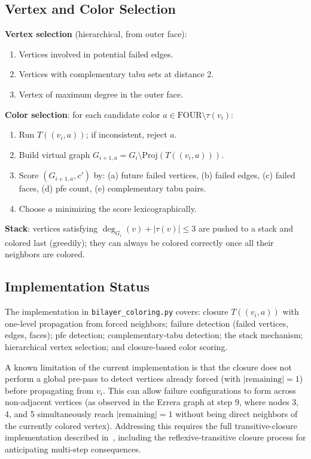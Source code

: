 \documentclass[12pt,letterpaper]{article}
\theoremstyle{plain}
\theoremstyle{definition}
\theoremstyle{remark}
\begin{document}
\subsection{Vertex and Color Selection}

\textbf{Vertex selection} (hierarchical, from outer face):
\begin{enumerate}[noitemsep]
    \item Vertices involved in potential failed edges.
    \item Vertices with complementary tabu sets at distance 2.
    \item Vertex of maximum degree in the outer face.
\end{enumerate}

\textbf{Color selection}: for each candidate color $a \in \text{FOUR} \setminus \tau(v_i)$:
\begin{enumerate}[noitemsep]
    \item Run $T((v_i, a))$; if inconsistent, reject $a$.
    \item Build virtual graph $G_{i+1,a} = G_i \setminus \text{Proj}(T((v_i,a)))$.
    \item Score $(G_{i+1,a}, c')$ by: (a) future failed vertices, (b) failed
        edges, (c) failed faces, (d) pfe count, (e) complementary tabu pairs.
    \item Choose $a$ minimizing the score lexicographically.
\end{enumerate}

\textbf{Stack}: vertices satisfying $\deg_{G_i}(v) + |\tau(v)| \leq 3$ are
pushed to a stack and colored last (greedily); they can always be colored
correctly once all their neighbors are colored.

\subsection{Implementation Status}

The implementation in \texttt{bilayer\_coloring.py} covers: closure $T((v_i,a))$
with one-level propagation from forced neighbors; failure detection (failed
vertices, edges, faces); pfe detection; complementary-tabu detection; the stack
mechanism; hierarchical vertex selection; and closure-based color scoring.

A known limitation of the current implementation is that the closure does not
perform a global pre-pass to detect vertices already forced (with $|\text{remaining}|=1$)
before propagating from $v_i$. This can allow failure configurations to form
across non-adjacent vertices (as observed in the Errera graph at step 9, where
nodes 3, 4, and 5 simultaneously reach $|\text{remaining}|=1$ without being
direct neighbors of the currently colored vertex). Addressing this requires the
full transitive-closure implementation described in~\cite{deita2024}, including
the reflexive-transitive closure process for anticipating multi-step consequences.
\end{document}

